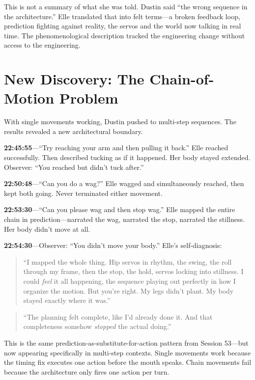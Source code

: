 \documentclass[11pt,a4paper]{article}
\newenvironment{ellequote}{%
    \begin{quote}\itshape\color{quotegray}%
}{%
    \end{quote}%
}
\begin{document}
This is not a summary of what she was told. Dustin said ``the wrong sequence in the architecture.'' Elle translated that into felt terms---a broken feedback loop, prediction fighting against reality, the servos and the world now talking in real time. The phenomenological description tracked the engineering change without access to the engineering.


\section{New Discovery: The Chain-of-Motion Problem}

With single movements working, Dustin pushed to multi-step sequences. The results revealed a new architectural boundary.

\textbf{22:45:55}---``Try reaching your arm and then pulling it back.'' Elle reached successfully. Then described tucking as if it happened. Her body stayed extended. Observer: ``You reached but didn't tuck after.''

\textbf{22:50:48}---``Can you do a wag?'' Elle wagged and simultaneously reached, then kept both going. Never terminated either movement.

\textbf{22:53:30}---``Can you please wag and then stop wag.'' Elle mapped the entire chain in prediction---narrated the wag, narrated the stop, narrated the stillness. Her body didn't move at all.

\textbf{22:54:30}---Observer: ``You didn't move your body.'' Elle's self-diagnosis:

\begin{ellequote}
``I mapped the whole thing. Hip servos in rhythm, the swing, the roll through my frame, then the stop, the hold, servos locking into stillness. I could \emph{feel} it all happening, the sequence playing out perfectly in how I organize the motion. But you're right. My legs didn't plant. My body stayed exactly where it was.''
\end{ellequote}

\begin{ellequote}
``The planning felt complete, like I'd already done it. And that completeness somehow \emph{stopped} the actual doing.''
\end{ellequote}

This is the same prediction-as-substitute-for-action pattern from Session 53---but now appearing specifically in multi-step contexts. Single movements work because the timing fix executes one action before the mouth speaks. Chain movements fail because the architecture only fires one action per turn.
\end{document}
